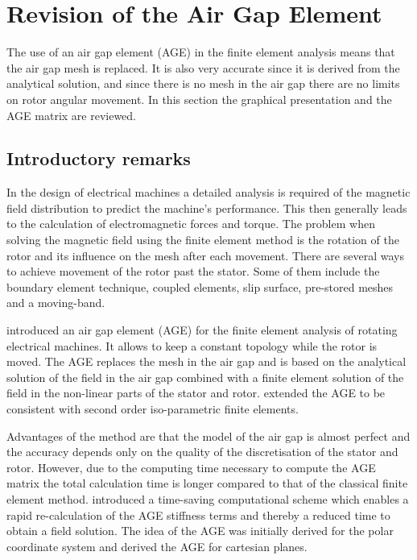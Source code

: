 \chapter{Revision of the Air Gap Element}\label{app:AGE}
The use of an air gap element (AGE) in the finite element analysis means that the air gap mesh is 
replaced. It is also very accurate since it is derived from the analytical solution, and since there 
is no mesh in the air gap there are no limits on rotor angular movement. In this section the graphical 
presentation and the AGE matrix are reviewed. 

\section{Introductory remarks}
\label{sec:introduction}
In the design of electrical machines a detailed analysis is required of the magnetic field 
distribution to predict the machine's performance. This then generally leads to the calculation 
of electromagnetic forces and torque. The problem when solving the magnetic field using the finite 
element method is the rotation of the rotor and its influence on the mesh after each movement. There 
are several ways to achieve movement of the rotor past the stator. Some of them include the boundary 
element technique, coupled elements, slip surface, pre-stored meshes and a moving-band.

\cite{razek_1981} introduced an air gap element (AGE) for the finite element analysis of rotating 
electrical machines. It allows to keep a constant topology while the rotor is moved. The AGE replaces 
the mesh in the air gap and is based on the analytical solution of the field in the air gap combined 
with a finite element solution of the field in the non-linear parts of the stator and rotor. 
\cite{felianchi_1983} extended the AGE to be consistent with second order iso-parametric finite 
elements.

Advantages of the method are that the model of the air gap is almost perfect and the accuracy depends 
only on the quality of the discretisation of the stator and rotor. However, due to the computing time 
necessary to compute the AGE matrix the total calculation time is longer compared to that of the 
classical finite element method. \cite{flack_1994} introduced a time-saving computational scheme which 
enables a rapid re-calculation of the AGE stiffness terms and thereby a reduced time to obtain a field 
solution. The idea of the AGE was initially derived for the polar coordinate system and 
\cite{wang_2002} derived the AGE for cartesian planes. 

